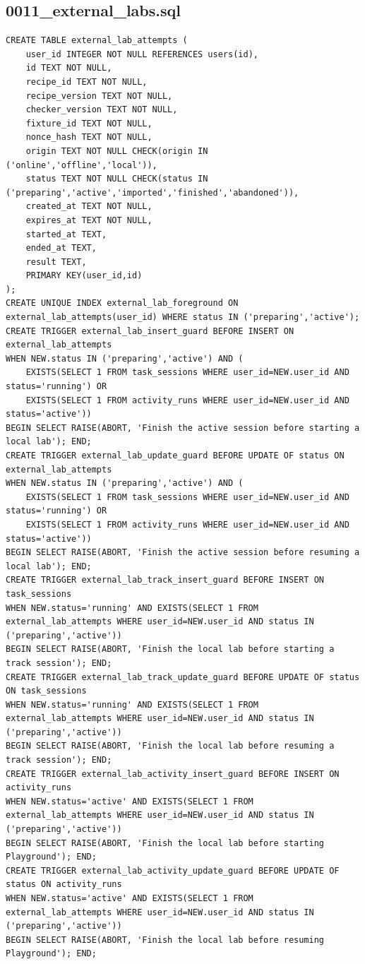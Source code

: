 \subsection{0011\_external\_labs.sql}
\begin{verbatim}
CREATE TABLE external_lab_attempts (
    user_id INTEGER NOT NULL REFERENCES users(id),
    id TEXT NOT NULL,
    recipe_id TEXT NOT NULL,
    recipe_version TEXT NOT NULL,
    checker_version TEXT NOT NULL,
    fixture_id TEXT NOT NULL,
    nonce_hash TEXT NOT NULL,
    origin TEXT NOT NULL CHECK(origin IN ('online','offline','local')),
    status TEXT NOT NULL CHECK(status IN ('preparing','active','imported','finished','abandoned')),
    created_at TEXT NOT NULL,
    expires_at TEXT NOT NULL,
    started_at TEXT,
    ended_at TEXT,
    result TEXT,
    PRIMARY KEY(user_id,id)
);
CREATE UNIQUE INDEX external_lab_foreground ON external_lab_attempts(user_id) WHERE status IN ('preparing','active');
CREATE TRIGGER external_lab_insert_guard BEFORE INSERT ON external_lab_attempts
WHEN NEW.status IN ('preparing','active') AND (
    EXISTS(SELECT 1 FROM task_sessions WHERE user_id=NEW.user_id AND status='running') OR
    EXISTS(SELECT 1 FROM activity_runs WHERE user_id=NEW.user_id AND status='active'))
BEGIN SELECT RAISE(ABORT, 'Finish the active session before starting a local lab'); END;
CREATE TRIGGER external_lab_update_guard BEFORE UPDATE OF status ON external_lab_attempts
WHEN NEW.status IN ('preparing','active') AND (
    EXISTS(SELECT 1 FROM task_sessions WHERE user_id=NEW.user_id AND status='running') OR
    EXISTS(SELECT 1 FROM activity_runs WHERE user_id=NEW.user_id AND status='active'))
BEGIN SELECT RAISE(ABORT, 'Finish the active session before resuming a local lab'); END;
CREATE TRIGGER external_lab_track_insert_guard BEFORE INSERT ON task_sessions
WHEN NEW.status='running' AND EXISTS(SELECT 1 FROM external_lab_attempts WHERE user_id=NEW.user_id AND status IN ('preparing','active'))
BEGIN SELECT RAISE(ABORT, 'Finish the local lab before starting a track session'); END;
CREATE TRIGGER external_lab_track_update_guard BEFORE UPDATE OF status ON task_sessions
WHEN NEW.status='running' AND EXISTS(SELECT 1 FROM external_lab_attempts WHERE user_id=NEW.user_id AND status IN ('preparing','active'))
BEGIN SELECT RAISE(ABORT, 'Finish the local lab before resuming a track session'); END;
CREATE TRIGGER external_lab_activity_insert_guard BEFORE INSERT ON activity_runs
WHEN NEW.status='active' AND EXISTS(SELECT 1 FROM external_lab_attempts WHERE user_id=NEW.user_id AND status IN ('preparing','active'))
BEGIN SELECT RAISE(ABORT, 'Finish the local lab before starting Playground'); END;
CREATE TRIGGER external_lab_activity_update_guard BEFORE UPDATE OF status ON activity_runs
WHEN NEW.status='active' AND EXISTS(SELECT 1 FROM external_lab_attempts WHERE user_id=NEW.user_id AND status IN ('preparing','active'))
BEGIN SELECT RAISE(ABORT, 'Finish the local lab before resuming Playground'); END;
\end{verbatim}
